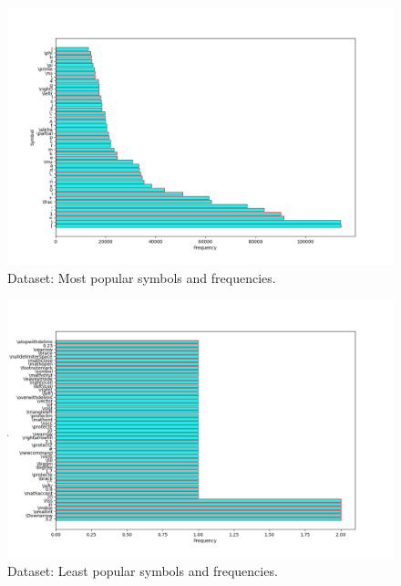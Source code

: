 \documentclass{article}
\begin{document}
\begin{figure}[H]
    \centering
    \includegraphics[scale=0.4]{fig_vocabs_frequency_1.png}
    \caption{Dataset: Most popular symbols and frequencies.}
    \label{fig:vocab_freq_1}
\end{figure}

\begin{figure}[H]
    \centering
    \includegraphics[scale=0.4]{fig_vocabs_frequency_2.png}
    \caption{Dataset: Least popular symbols and frequencies.}
    \label{fig:vocab_freq_2}
\end{figure}
\end{document}
